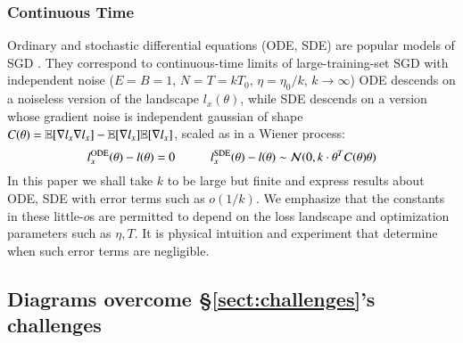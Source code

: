             \subsubsection{Continuous Time}
                Ordinary and stochastic differential equations (ODE, SDE) are
                popular models of SGD \citep{li18, ba21}.  They correspond to
                continuous-time limits of large-training-set SGD with
                independent noise ($E=B=1$, $N=T=kT_0$, $\eta=\eta_0/k$, $k\to
                \infty$) ODE descends on a noiseless version of the landscape
                $l_x(\theta)$, while SDE descends on a version whose gradient
                noise is independent gaussian of shape $C(\theta) =
                \mathbb{E}[\nabla l_x \nabla l_x] - \mathbb{E}[\nabla l_x] \mathbb{E}[\nabla
                l_x]$, scaled as in a Wiener process:
                $$
                    l^{\text{ODE}}_x(\theta) - l(\theta) = 0
                    \hspace{1cm}
                    l^{\text{SDE}}_x(\theta) - l(\theta)
                        \sim \mathcal{N}(0, k\cdot \theta^T C(\theta)\theta)
                $$
                In this paper we shall take $k$ to be large but finite and
                express results about ODE, SDE with error terms such as
                $o(1/k)$.  We emphasize that the constants in these little-$o$s
                are permitted to depend on the loss landscape and optimization
                parameters such as $\eta, T$.  It is physical intuition and
                experiment that determine when such error terms are negligible.

        \subsection{Diagrams overcome \S\ref{sect:challenges}'s challenges}\label{sect:using}\label{sect:diagrams}

